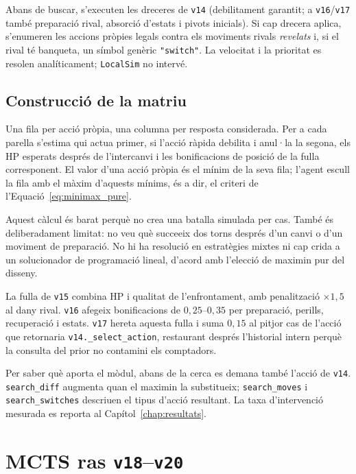 Abans de buscar, s'executen les dreceres de \texttt{v14} (debilitament garantit; a \texttt{v16}/\texttt{v17} també preparació rival, absorció d'estats i pivots inicials). Si cap drecera aplica, s'enumeren les accions pròpies legals contra els moviments rivals \emph{revelats} i, si el rival té banqueta, un símbol genèric \texttt{"switch"}. La velocitat i la prioritat es resolen analíticament; \texttt{LocalSim} no intervé.

\subsection{Construcció de la matriu}

Una fila per acció pròpia, una columna per resposta considerada. Per a cada parella s'estima qui actua primer, si l'acció ràpida debilita i anul·la la segona, els HP esperats després de l'intercanvi i les bonificacions de posició de la fulla corresponent. El valor d'una acció pròpia és el mínim de la seva fila; l'agent escull la fila amb el màxim d'aquests mínims, és a dir, el criteri de l'Equació~\ref{eq:minimax_pure}.

Aquest càlcul és barat perquè no crea una batalla simulada per cas. També és deliberadament limitat: no veu què succeeix dos torns després d'un canvi o d'un moviment de preparació. No hi ha resolució en estratègies mixtes ni cap crida a un solucionador de programació lineal, d'acord amb l'elecció de maximin pur del disseny.

La fulla de \texttt{v15} combina HP i qualitat de l'enfrontament, amb penalització $\times 1{,}5$ al dany rival. \texttt{v16} afegeix bonificacions de $0{,}25$--$0{,}35$ per preparació, perills, recuperació i estats. \texttt{v17} hereta aquesta fulla i suma $0{,}15$ al pitjor cas de l'acció que retornaria \texttt{v14.\_select\_action}, restaurant després l'historial intern perquè la consulta del prior no contamini els comptadors.

Per saber què aporta el mòdul, abans de la cerca es demana també l'acció de \texttt{v14}. \texttt{search\_diff} augmenta quan el maximin la substitueix; \texttt{search\_moves} i \texttt{search\_switches} descriuen el tipus d'acció resultant. La taxa d'intervenció mesurada es reporta al Capítol~\ref{chap:resultats}.

\section{MCTS ras \texttt{v18}--\texttt{v20}}
\label{sec:mcts_impl}

